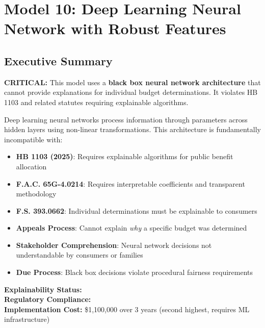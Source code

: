 \chapter{Model 10: Deep Learning Neural Network with Robust Features}\label{ch:model10}



\section{Executive Summary}

\begin{tcolorbox}[colback=red!10!white, colframe=red!75!black, title=\textbf{REGULATORY WARNING: NOT COMPLIANT}]
\textbf{CRITICAL:} This model uses a \textbf{black box neural network architecture} that cannot provide explanations for individual budget determinations. It violates HB 1103 and related statutes requiring explainable algorithms.

Deep learning neural networks process information through \ModelTenTotalParams{} parameters across \ModelTenHiddenLayers{} hidden layers using non-linear transformations. This architecture is fundamentally incompatible with:

\begin{itemize}
    \item \textbf{HB 1103 (2025)}: Requires explainable algorithms for public benefit allocation
    \item \textbf{F.A.C. 65G-4.0214}: Requires interpretable coefficients and transparent methodology
    \item \textbf{F.S. 393.0662}: Individual determinations must be explainable to consumers
    \item \textbf{Appeals Process}: Cannot explain \textit{why} a specific budget was determined
    \item \textbf{Stakeholder Comprehension}: Neural network decisions not understandable by consumers or families
    \item \textbf{Due Process}: Black box decisions violate procedural fairness requirements
\end{itemize}

\textbf{Explainability Status:} \ModelTenExplainability{} \\
\textbf{Regulatory Compliance:} \ModelTenRegulatoryCompliant{} \\
\textbf{Implementation Cost:} \$1,100,000 over 3 years (second highest, requires ML infrastructure)


\end{tcolorbox}
